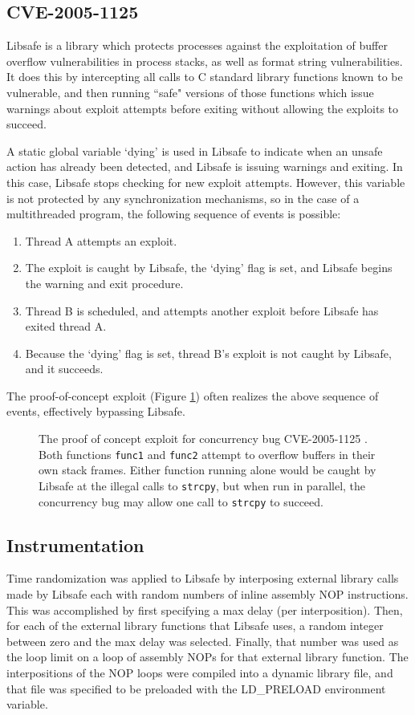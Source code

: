 \documentclass[letterpaper,twocolumn,10pt]{article}
\begin{document}
\subsection{CVE-2005-1125}
Libsafe is a library which protects processes against the exploitation of buffer overflow vulnerabilities in process stacks, as well as format string vulnerabilities.  It does this by intercepting all calls to C standard library functions known to be vulnerable, and then running ``safe" versions of those functions which issue warnings about exploit attempts before exiting without allowing the exploits to succeed.

A static global variable `dying' is used in Libsafe to indicate when an unsafe action has already been detected, and Libsafe is issuing warnings and exiting.  In this case, Libsafe stops checking for new exploit attempts.  However, this variable is not protected by any synchronization mechanisms, so in the case of a multithreaded program, the following sequence of events is possible:
\begin{enumerate}
	\item Thread A attempts an exploit.
	\item The exploit is caught by Libsafe, the `dying' flag is set, and Libsafe begins the warning and exit procedure.
	\item Thread B is scheduled, and attempts another exploit before Libsafe has exited thread A.
	\item Because the `dying' flag is set, thread B's exploit is not caught by Libsafe, and it succeeds.
\end{enumerate}
The proof-of-concept exploit (Figure \ref{fig_poc}) often realizes the above sequence of events, effectively bypassing Libsafe.
\begin{figure}

\caption{The proof of concept exploit for concurrency bug CVE-2005-1125 \cite{CVE2005-1125}.  Both functions \texttt{func1} and \texttt{func2} attempt to overflow buffers in their own stack frames.  Either function running alone would be caught by Libsafe at the illegal calls to \texttt{strcpy}, but when run in parallel, the concurrency bug may allow one call to \texttt{strcpy} to succeed.}
\label{fig_poc}
\end{figure}
\subsection{Instrumentation \cite{Conrad2009}}
Time randomization was applied to Libsafe by interposing external library calls made by Libsafe each with random numbers of inline assembly NOP instructions.  This was accomplished by first specifying a max delay (per interposition).  Then, for each of the external library functions that Libsafe uses, a random integer between zero and the max delay was selected.  Finally, that number was used as the loop limit on a loop of assembly NOPs for that external library function.  The interpositions of the NOP loops were compiled into a dynamic library file, and that file was specified to be preloaded with the LD\_PRELOAD environment variable.
\end{document}
